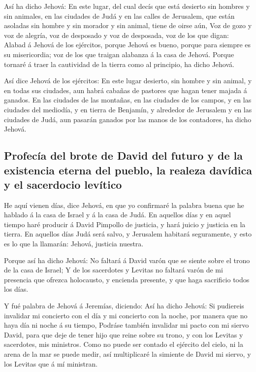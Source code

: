  Así ha dicho Jehová: En este lugar, del cual decís que
está desierto sin hombres y sin animales, en las ciudades de Judá y en
las calles de Jerusalem, que están asoladas sin hombre y sin morador y
sin animal, tiene de oirse aún,  Voz de gozo y voz de
alegría, voz de desposado y voz de desposada, voz de los que digan:
Alabad á Jehová de los ejércitos, porque Jehová es bueno, porque para
siempre es su misericordia; voz de los que traigan alabanza á la casa de
Jehová. Porque tornaré á traer la cautividad de la tierra como al
principio, ha dicho Jehová.

 Así dice Jehová de los ejércitos: En este lugar
desierto, sin hombre y sin animal, y en todas sus ciudades, aun habrá
cabañas de pastores que hagan tener majada á ganados.  En
las ciudades de las montañas, en las ciudades de los campos, y en las
ciudades del mediodía, y en tierra de Benjamín, y alrededor de Jerusalem
y en las ciudades de Judá, aun pasarán ganados por las manos de los
contadores, ha dicho Jehová.

\hypertarget{profecuxeda-del-brote-de-david-del-futuro-y-de-la-existencia-eterna-del-pueblo-la-realeza-davuxeddica-y-el-sacerdocio-levuxedtico}{%
\subsection{Profecía del brote de David del futuro y de la existencia
eterna del pueblo, la realeza davídica y el sacerdocio
levítico}\label{profecuxeda-del-brote-de-david-del-futuro-y-de-la-existencia-eterna-del-pueblo-la-realeza-davuxeddica-y-el-sacerdocio-levuxedtico}}

 He aquí vienen días, dice Jehová, en que yo confirmaré
la palabra buena que he hablado á la casa de Israel y á la casa de Judá.
 En aquellos días y en aquel tiempo haré producir á David
Pimpollo de justicia, y hará juicio y justicia en la tierra.
 En aquellos días Judá será salvo, y Jerusalem habitará
seguramente, y esto es lo que la llamarán: Jehová, justicia nuestra.

 Porque así ha dicho Jehová: No faltará á David varón que
se siente sobre el trono de la casa de Israel;  Y de los
sacerdotes y Levitas no faltará varón de mi presencia que ofrezca
holocausto, y encienda presente, y que haga sacrificio todos los días.

 Y fué palabra de Jehová á Jeremías, diciendo:
 Así ha dicho Jehová: Si pudiereis invalidar mi concierto
con el día y mi concierto con la noche, por manera que no haya día ni
noche á su tiempo,  Podráse también invalidar mi pacto
con mi siervo David, para que deje de tener hijo que reine sobre su
trono, y con los Levitas y sacerdotes, mis ministros. 
Como no puede ser contado el ejército del cielo, ni la arena de la mar
se puede medir, así multiplicaré la simiente de David mi siervo, y los
Levitas que á mí ministran.

